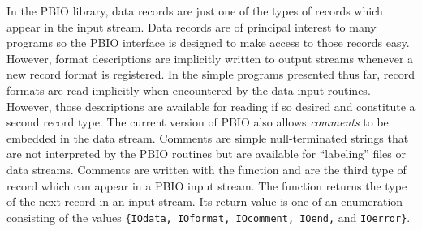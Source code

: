 In the PBIO library, data records are just one of the types of records which
appear in the input stream.  Data records are of principal interest to many
programs so the PBIO interface is designed to make access to those records
easy.  However, format descriptions are implicitly written to output streams
whenever a new record format is registered.  In the simple programs presented
thus far, record formats are read implicitly when encountered by the data
input routines.  However, those descriptions are available for reading if so
desired and constitute a second record type.  The current version of PBIO also
allows {\it comments} to be embedded in the data stream.  Comments are simple
null-terminated strings that are not interpreted by the PBIO routines but are
available for ``labeling'' files or data streams.  Comments are written with
the  function and are the third  type of record which can
appear in  a PBIO input stream.  The function  returns
the type of the next record in an input stream.  Its return value is one of an
enumeration consisting of the values {\tt \{IOdata, IOformat, IOcomment, IOend,}
and {\tt IOerror\}}.  
